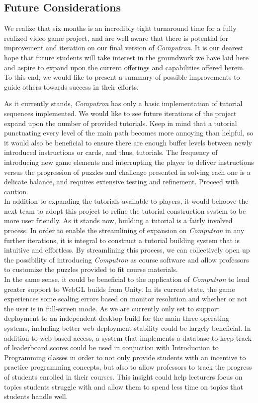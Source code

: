 \subsection{Future Considerations}
We realize that six months is an incredibly tight turnaround time for a fully realized video game project, and are well aware that there is potential for improvement and iteration on our final version of \textit{Computron}. It is our dearest hope that future students will take interest in the groundwork we have laid here and aspire to expand upon the current offerings and capabilities offered herein. To this end, we would like to present a summary of possible improvements to guide others towards success in their efforts.

As it currently stands, \textit{Computron} has only a basic implementation of tutorial sequences implemented. We would like to see future iterations of the project expand upon the number of provided tutorials. Keep in mind that a tutorial punctuating every level of the main path becomes more annoying than helpful, so it would also be beneficial to ensure there are enough buffer levels between newly introduced instructions or cards, and thus, tutorials. The frequency of introducing new game elements and interrupting the player to deliver instructions versus the progression of puzzles and challenge presented in solving each one is a delicate balance, and requires extensive testing and refinement. Proceed with caution.\\

In addition to expanding the tutorials available to players, it would behoove the next team to adopt this project to refine the tutorial construction system to be more user friendly. As it stands now, building a tutorial is a fairly involved process. In order to enable the streamlining of expansion on \textit{Computron} in any further iterations, it is integral to construct a tutorial building system that is intuitive and effortless. By streamlining this process, we can collectively open up the possibility of introducing \textit{Computron} as course software and allow professors to customize the puzzles provided to fit course materials.\\

In the same sense, it could be beneficial to the application of \textit{Computron} to lend greater support to WebGL builds from Unity. In its current state, the game experiences some scaling errors based on monitor resolution and whether or not the user is in full-screen mode. As we are currently only set to support deployment to an independent desktop build for the main three operating systems, including better web deployment stability could be largely beneficial. In addition to web-based access, a system that implements a database to keep track of leaderboard scores could be used in conjuction with Introduction to Programming classes in order to not only provide students with an incentive to practice programming concepts, but also to allow professors to track the progress of students enrolled in their courses. This insight could help lecturers focus on topics students struggle with and allow them to spend less time on topics that students handle well.\\



